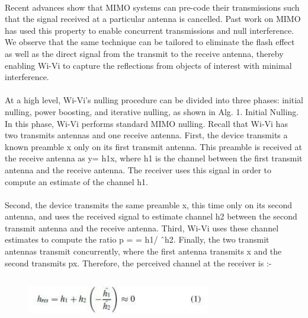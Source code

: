 \documentclass[a4paper,12pt,oneside]{article}
\begin{document}
\paragraph{}
Recent advances show that MIMO systems can pre-code their transmissions such that the
signal received at a particular antenna is cancelled. Past work on MIMO has used this property to
enable concurrent transmissions and null interference. We observe that the same technique can be
tailored to eliminate the flash effect as well as the direct signal from the transmit to the receive
antenna, thereby enabling Wi-Vi to capture the reflections from objects of interest with minimal
interference.
\paragraph{}
At a high level, Wi-Vi’s nulling procedure can be divided into three phases: initial
nulling, power boosting, and iterative nulling, as shown in Alg. 1. Initial Nulling. In this phase,
Wi-Vi performs standard MIMO nulling. Recall that Wi-Vi has two transmits antennas and one
receive antenna. First, the device transmits a known preamble x only on its first transmit antenna.
This preamble is received at the receive antenna as y= h1x, where h1 is the channel between the
first transmit antenna and the receive antenna. The receiver uses this signal in order to compute
an estimate of the channel h1.
\paragraph{}
Second, the device transmits the same preamble x, this time only on its second antenna, and
uses the received signal to estimate channel h2 between the second transmit antenna and the
receive antenna. Third, Wi-Vi uses these channel estimates to compute the ratio p = = h1/ ˆh2.
Finally, the two transmit antennas transmit concurrently, where the first antenna transmits x and
the second transmits px. Therefore, the perceived channel at the receiver is :-

\begin{figure}[H]
\centering
\includegraphics[height=2cm,width=8cm]{8a.png}
\end{figure}
\end{document}
